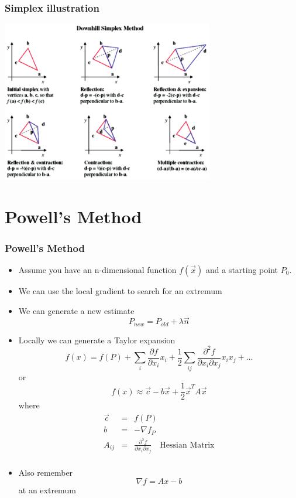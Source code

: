 \documentclass[10pt]{beamer}
\begin{document}
\begin{frame}
  \frametitle{Simplex illustration}
  \centerline{\includegraphics[height=7cm]{simplex}}
\end{frame}

\section{Powell's Method}
\label{sec:powells-method}

\begin{frame}
  \frametitle{Powell's Method}
  \begin{itemize}
  \item Assume you have an n-dimensional function $f(\vec{x})$ and a starting point $P_0$. 
  \item We can use the local gradient to search for an extremum
  \item We can generate a new estimate
    \[
      P_{new} = P_{old} + \lambda \vec{n}
    \]
  \item Locally we can generate a Taylor expansion
    \[
      f(x) = f(P) + \sum_i \frac{\partial f}{\partial x_i} x_i + \frac{1}{2} \sum_{ij} \frac{\partial^2f}{\partial x_i \partial x_j} x_i x_j + \ldots
    \] or 
    \[
      f(x) \approx \vec{c} - b \vec{x} + \frac{1}{2} \vec{x}^T A \vec{x}
    \] where
    \[
      \begin{array}{ccc}
        \vec{c} &= & f(P)\\
        b & = & - \nabla f_P \\
        A_{ij} & = & \frac{\partial^2 f}{\partial x_i \partial x_j} \mbox{~~ Hessian Matrix} \\
      \end{array}
    \] 
  \item Also remember
    \[ \nabla f = A x - b \]
    at an extremum
  \end{itemize}
\end{frame}
\end{document}
